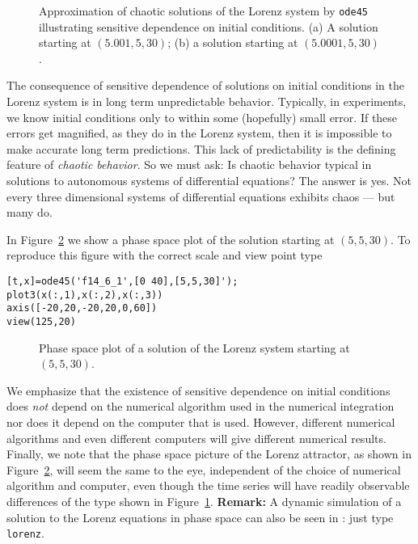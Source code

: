 \begin{figure}[htb]
   \centerline{%
   }
   \caption{Approximation of chaotic solutions of the Lorenz system by 
	{\tt ode45} illustrating sensitive dependence on initial conditions.
 	 (a) A solution starting at $(5.001,5,30)$;
  	 (b) a solution starting at $(5.0001,5,30)$.}
   \label{fig:lorenz2}
\end{figure}

The consequence of sensitive dependence of solutions on initial conditions in 
the Lorenz system is in long term unpredictable behavior.  Typically, in
experiments, we know initial conditions only to within some (hopefully) small
error.  If these errors get magnified, as they do in the Lorenz system, then
it is impossible to make accurate long term predictions.  This lack of
predictability is the defining feature of {\em chaotic behavior}.
  So we must ask:  Is chaotic behavior typical in solutions to
autonomous systems of differential equations?  The answer is yes.  Not every
three dimensional systems of differential equations exhibits chaos --- but
many do.  

In Figure~\ref{fig:lorenz3} we show a phase space plot of the
solution starting at $(5,5,30)$.  To reproduce this figure with the 
correct scale and view point type
\begin{verbatim}
[t,x]=ode45('f14_6_1',[0 40],[5,5,30]');
plot3(x(:,1),x(:,2),x(:,3))
axis([-20,20,-20,20,0,60])
view(125,20)
\end{verbatim}
\begin{figure}[htb]
   \centerline{%
   }
   \caption{Phase space plot of a solution of the Lorenz system
   starting at $(5,5,30)$.}
   \label{fig:lorenz3}
\end{figure}

We emphasize that the existence of sensitive dependence on initial conditions 
does {\em not\/} depend on the numerical algorithm used in the numerical 
integration nor does it depend on the computer that is used.  However, 
different numerical algorithms and even different computers will give 
different numerical results.   Finally, we note that the phase space picture 
of the Lorenz attractor, as shown in 
Figure~\ref{fig:lorenz3}, will seem the same to the eye, independent of the 
choice of numerical algorithm and computer,
even though the time series will have readily observable differences of the
type shown in Figure~\ref{fig:lorenz2}.  {\bf Remark:}  A dynamic simulation 
of a solution to the Lorenz equations in phase space can also be seen in 
\Matlabp: just type {\tt lorenz}.

